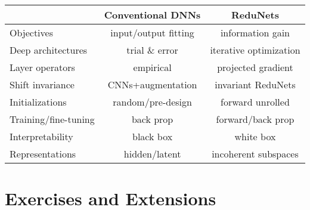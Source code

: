 \documentclass[\toplevelprefix/book-main.tex]{subfiles}
\begin{document}
\begin{center}
\begin{tabular}{| l || c | c |}
\hline
  & Conventional DNNs & ReduNets\\ [0.5ex]
  \hline \hline
Objectives & input/output fitting & information gain\\ [0.5ex]
  \hline
Deep architectures & trial \& error & iterative optimization \\  [0.5ex]
\hline
Layer operators & empirical & projected gradient \\  [0.5ex]
\hline
Shift invariance & CNNs+augmentation & invariant ReduNets \\  [0.5ex]
\hline
Initializations & random/pre-design & forward unrolled \\ [0.5ex]
\hline
Training/fine-tuning & back prop & forward/back prop\\ [0.5ex]
\hline
Interpretability & black box & white box \\ [0.5ex]
\hline
Representations & hidden/latent & incoherent subspaces \\ [0.5ex]
\hline
\end{tabular}
\end{center}




\section{Exercises and Extensions}
\end{document}
